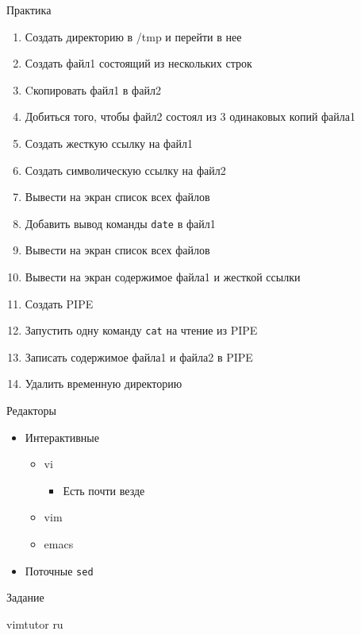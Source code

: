 \documentclass[ignorenonframetext, professionalfonts, hyperref={unicode}]{beamer}
\begin{document}
\begin{frame}[fragile]{Практика}
	\begin{enumerate}
		\item Создать директорию в /tmp и перейти в нее
		\item Создать файл1 состоящий из нескольких строк
		\item Cкопировать файл1 в файл2
		\item Добиться того, чтобы файл2 состоял из 3 одинаковых копий файла1
		\item Создать жесткую ссылку на файл1
		\item Создать символическую ссылку на файл2
		\item Вывести на экран список всех файлов
		\item Добавить вывод команды {\tt date} в файл1
		\item Вывести на экран список всех файлов
		\item Вывести на экран содержимое файла1 и жесткой ссылки
		\item Создать PIPE
		\item Запустить одну команду {\tt cat} на чтение из PIPE
		\item Записать содержимое файла1 и файла2 в PIPE
		\item Удалить временную директорию
	\end{enumerate}
\end{frame}

\begin{frame}{Редакторы}
\begin{itemize}
 \item Интерактивные
 \begin{itemize}
 \item vi
   \begin{itemize}
    \item Есть почти везде
   \end{itemize}
 \item vim
 \item emacs
 \end{itemize}
 \item Поточные {\tt sed}
 \end{itemize}
\end{frame}

\begin{frame}{Задание}
\begin{block}{}
vimtutor ru
\end{block}
\end{frame}
\end{document}
